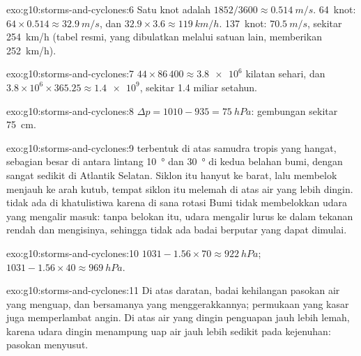 \begin{solution}{exo:g10:storms-and-cyclones:6}
Satu knot adalah $1852/3600 \approx \qty{0.514}{m/s}$. \num{64}~knot: $64 \times
0.514 \approx \qty{32.9}{m/s}$, dan $32.9 \times 3.6 \approx
\qty{119}{km/h}$. \num{137}~knot: $\qty{70.5}{m/s}$, sekitar
\qty{254}{km/h} (tabel resmi, yang dibulatkan melalui satuan lain, memberikan
\qty{252}{km/h}).
\end{solution}

\begin{solution}{exo:g10:storms-and-cyclones:7}
$44 \times 86\,400 \approx \num{3.8e6}$ kilatan sehari, dan $3.8\times10^6
\times 365.25 \approx \num{1.4e9}$, sekitar 1.4 miliar setahun.
\end{solution}

\begin{solution}{exo:g10:storms-and-cyclones:8}
$\Delta p = 1010 - 935 = \qty{75}{hPa}$: gembungan sekitar \qty{75}{cm}.
\end{solution}

\begin{solution}{exo:g10:storms-and-cyclones:9}
 terbentuk di atas samudra tropis yang hangat, sebagian besar di
antara lintang \qty{10}{\degree} dan \qty{30}{\degree} di kedua belahan bumi,
dengan sangat sedikit di Atlantik Selatan. Siklon itu hanyut ke barat, lalu
membelok menjauh ke arah kutub, tempat siklon itu melemah di atas air yang
lebih dingin.  tidak ada di khatulistiwa karena di sana rotasi
Bumi tidak membelokkan udara yang mengalir masuk: tanpa belokan itu, udara
mengalir lurus ke dalam tekanan rendah dan mengisinya, sehingga tidak ada badai
berputar yang dapat dimulai.
\end{solution}

\begin{solution}{exo:g10:storms-and-cyclones:10}
$1031 - 1.56 \times 70 \approx \qty{922}{hPa}$; $1031 - 1.56 \times 40
\approx \qty{969}{hPa}$.
\end{solution}

\begin{solution}{exo:g10:storms-and-cyclones:11}
Di atas daratan, badai kehilangan pasokan air yang menguap, dan bersamanya
 yang menggerakkannya; permukaan yang kasar juga memperlambat
angin. Di atas air yang dingin penguapan jauh lebih lemah, karena udara dingin
menampung uap air jauh lebih sedikit pada kejenuhan: pasokan 
menyusut.
\end{solution}


